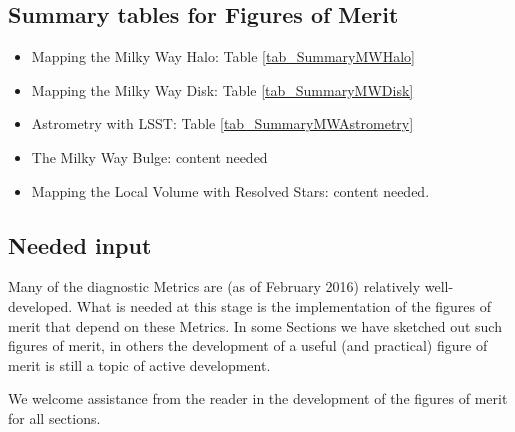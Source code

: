 
\subsection{Summary tables for Figures of Merit}

\begin{itemize}
  \item Mapping the Milky Way Halo: Table \ref{tab_SummaryMWHalo}
  \item Mapping the Milky Way Disk: Table \ref{tab_SummaryMWDisk}
  \item Astrometry with LSST: Table \ref{tab_SummaryMWAstrometry}
  \item The Milky Way Bulge: content needed
  \item Mapping the Local Volume with Resolved Stars: content needed.
\end{itemize}

\subsection{Needed input}

Many of the diagnostic Metrics are (as of February 2016) relatively
well-developed. What is needed at this stage is the implementation of
the figures of merit that depend on these Metrics. In some Sections we
have sketched out such figures of merit, in others the development of
a useful (and practical) figure of merit is still a topic of active
development. 

We welcome assistance from the reader in the development of the
figures of merit for all sections. 




%
%

